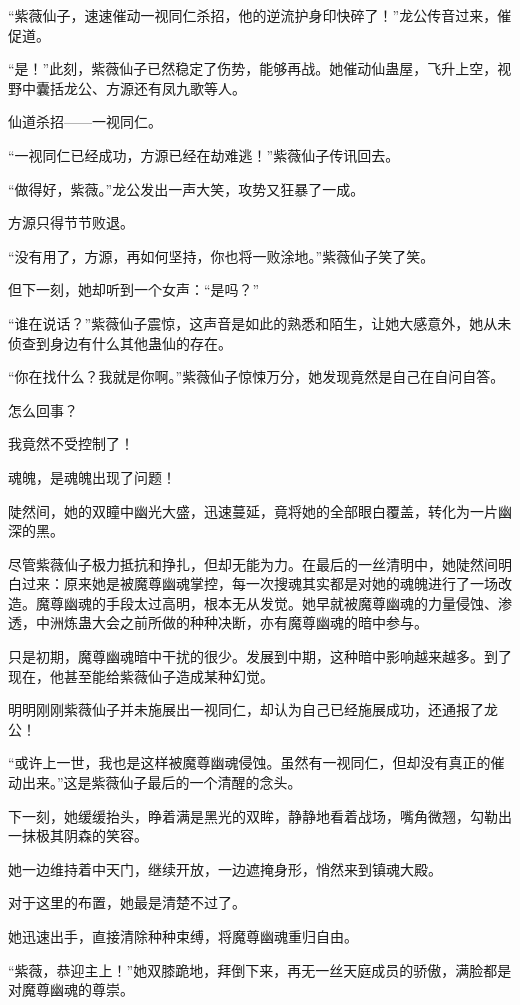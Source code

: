 \begin{this_body}
“紫薇仙子，速速催动一视同仁杀招，他的逆流护身印快碎了！”龙公传音过来，催促道。

“是！”此刻，紫薇仙子已然稳定了伤势，能够再战。她催动仙蛊屋，飞升上空，视野中囊括龙公、方源还有凤九歌等人。

仙道杀招——一视同仁。

“一视同仁已经成功，方源已经在劫难逃！”紫薇仙子传讯回去。

“做得好，紫薇。”龙公发出一声大笑，攻势又狂暴了一成。

方源只得节节败退。

“没有用了，方源，再如何坚持，你也将一败涂地。”紫薇仙子笑了笑。

但下一刻，她却听到一个女声：“是吗？”

“谁在说话？”紫薇仙子震惊，这声音是如此的熟悉和陌生，让她大感意外，她从未侦查到身边有什么其他蛊仙的存在。

“你在找什么？我就是你啊。”紫薇仙子惊悚万分，她发现竟然是自己在自问自答。

怎么回事？

我竟然不受控制了！

魂魄，是魂魄出现了问题！

陡然间，她的双瞳中幽光大盛，迅速蔓延，竟将她的全部眼白覆盖，转化为一片幽深的黑。

尽管紫薇仙子极力抵抗和挣扎，但却无能为力。在最后的一丝清明中，她陡然间明白过来：原来她是被魔尊幽魂掌控，每一次搜魂其实都是对她的魂魄进行了一场改造。魔尊幽魂的手段太过高明，根本无从发觉。她早就被魔尊幽魂的力量侵蚀、渗透，中洲炼蛊大会之前所做的种种决断，亦有魔尊幽魂的暗中参与。

只是初期，魔尊幽魂暗中干扰的很少。发展到中期，这种暗中影响越来越多。到了现在，他甚至能给紫薇仙子造成某种幻觉。

明明刚刚紫薇仙子并未施展出一视同仁，却认为自己已经施展成功，还通报了龙公！

“或许上一世，我也是这样被魔尊幽魂侵蚀。虽然有一视同仁，但却没有真正的催动出来。”这是紫薇仙子最后的一个清醒的念头。

下一刻，她缓缓抬头，睁着满是黑光的双眸，静静地看着战场，嘴角微翘，勾勒出一抹极其阴森的笑容。

她一边维持着中天门，继续开放，一边遮掩身形，悄然来到镇魂大殿。

对于这里的布置，她最是清楚不过了。

她迅速出手，直接清除种种束缚，将魔尊幽魂重归自由。

“紫薇，恭迎主上！”她双膝跪地，拜倒下来，再无一丝天庭成员的骄傲，满脸都是对魔尊幽魂的尊崇。


\end{this_body}
